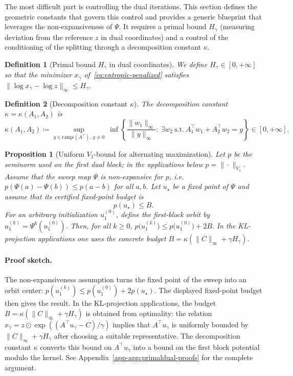 \documentclass{article}
\theoremstyle{plain}
\newtheorem{proposition}{Proposition}[section]
\newtheorem{definition}{Definition}[section]
\newcommand{\norm}[1]{\|#1\|}
\newcommand{\norminf}[1]{\norm{#1}_\infty}
\newcommand{\z}{z}
\begin{document}
The most difficult part is controlling the dual iterations. This section defines the geometric constants that govern this control and provides a generic blueprint that leverages the non-expansiveness of $\Psi$. It requires a primal bound $H_\gamma$ (measuring deviation from the reference $\z$ in dual coordinates) and a control of the conditioning of the splitting through a decomposition constant $\kappa$.

\begin{definition}[Primal bound $H_\gamma$ in dual coordinates]\label{def:hgamma}
We define $H_\gamma\in[0,+\infty]$ so that the minimizer $x_\gamma$ of~\eqref{eq:entropic-penalized} satisfies
$
  \|\log x_\gamma - \log \z\|_\infty \le H_\gamma.
$
\end{definition}



\begin{definition}[Decomposition constant $\kappa$]
The decomposition constant $\kappa=\kappa(A_1,A_2)$ is
\begin{equation}\label{eq:kappa}
\kappa(A_1,A_2)  \coloneqq 
\sup_{y\in\mathrm{range}(A^\top),\,y\neq 0}
\ \inf\left\{
\frac{\norminf{w_1}}{\norminf{y}}:\ \exists w_2\ \text{s.t.}\ A_1^\top w_1 + A_2^\top w_2 = y
\right\}\in[0,+\infty].
\end{equation}
\end{definition}

\begin{proposition}[Uniform $V_1$-bound for alternating maximization]\label{prop:uniform-iter-final}
Let $p$ be the seminorm used on the first dual block; in the applications below
$p=\|\cdot\|_{V_1}$.  Assume that the sweep map $\Psi$ is non-expansive for
$p$, i.e. $p(\Psi(a)-\Psi(b))\le p(a-b)$ for all $a,b$.  Let $u_\star$ be a
fixed point of $\Psi$ and assume that its certified fixed-point budget is
\[
  p(u_\star)\le B .
\]
For an arbitrary initialization $u_1^{(0)}$, define the first-block orbit by
$u_1^{(k)}=\Psi^k(u_1^{(0)})$.
Then, for all $k\ge 0$,
$
		p\bigl(u_1^{(k)}\bigr)
		\le
		p\bigl(u_1^{(0)}\bigr)
		+2B.
$
In the KL-projection applications one uses the concrete budget
$B=\kappa(\|C\|_\infty+\gamma H_\gamma)$.
\end{proposition}

\paragraph{Proof sketch.}
The non-expansiveness assumption turns the fixed point of the sweep into an orbit center:
$p(u_1^{(k)})\le p(u_1^{(0)})+2p(u_\star)$.  The displayed fixed-point budget then gives the result. In the KL-projection applications, the budget $B=\kappa(\|C\|_\infty+\gamma H_\gamma)$ is obtained from optimality: the relation $x_\gamma=z\odot\exp((A^\top u_\gamma-C)/\gamma)$ implies that $A^\top u_\gamma$ is uniformly bounded by $\|C\|_\infty+\gamma H_\gamma$ after choosing a suitable representative. The decomposition constant $\kappa$ converts this bound on $A^\top u_\gamma$ into a bound on the first block potential modulo the kernel. See Appendix~\ref{app-app:primaldual-proofs} for the complete argument.
\end{document}
